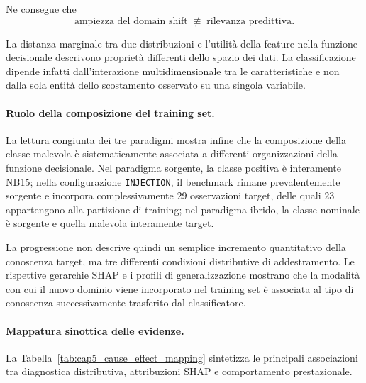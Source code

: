 Ne consegue che
\[
    \text{ampiezza del domain shift}
    \;\not\equiv\;
    \text{rilevanza predittiva}.
\]

La distanza marginale tra due distribuzioni e l'utilità della feature nella funzione decisionale descrivono proprietà differenti dello spazio dei dati.
La classificazione dipende infatti dall'interazione multidimensionale tra le caratteristiche e non dalla sola entità dello scostamento osservato su una singola variabile.

\paragraph{Ruolo della composizione del training set.}
La lettura congiunta dei tre paradigmi mostra infine che la composizione della classe malevola è sistematicamente associata a differenti organizzazioni della funzione decisionale. 
Nel paradigma sorgente, la classe positiva è interamente NB15; nella configurazione \texttt{INJECTION}, il benchmark rimane prevalentemente sorgente e incorpora complessivamente $29$ osservazioni target, delle quali $23$ appartengono alla partizione di training; nel paradigma ibrido, la classe nominale è sorgente e quella malevola interamente target. 

La progressione non descrive quindi un semplice incremento quantitativo della conoscenza target, ma tre differenti condizioni distributive di addestramento. 
Le rispettive gerarchie SHAP e i profili di generalizzazione mostrano che la modalità con cui il nuovo dominio viene incorporato nel training set è associata al tipo di conoscenza successivamente trasferito dal classificatore.

\paragraph{Mappatura sinottica delle evidenze.}
La Tabella~\ref{tab:cap5_cause_effect_mapping} sintetizza le principali associazioni tra diagnostica distributiva, attribuzioni SHAP e comportamento prestazionale.

